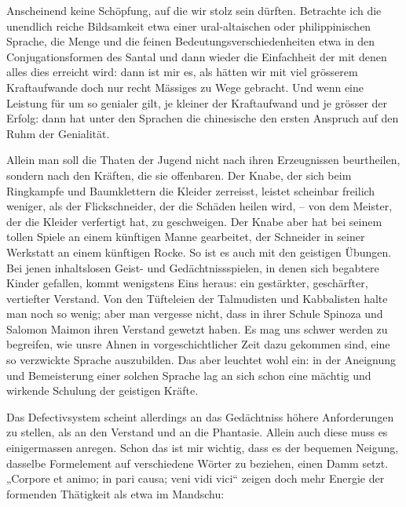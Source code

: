 Anscheinend keine Schöpfung, auf die wir stolz sein dürften. Betrachte ich die  unendlich reiche Bildsamkeit etwa einer ural-altaischen oder philippinischen Sprache, die Menge und die feinen Bedeutungsverschiedenheiten etwa in den Conjugationsformen des Santal und dann wieder die Einfachheit der  mit denen alles dies erreicht wird: dann ist mir es, als hätten wir mit viel grösserem Kraftaufwande doch nur recht Mässiges zu Wege gebracht. Und wenn eine Leistung für um so genialer gilt, je kleiner der Kraftaufwand und je grösser der Erfolg: dann hat unter den Sprachen die chinesische den ersten Anspruch auf den Ruhm der Genialität.

Allein man soll die Thaten der Jugend nicht nach ihren Erzeugnissen beurtheilen, sondern nach den Kräften, die sie offenbaren. Der Knabe, der sich beim Ringkampfe und Baumklettern die Kleider zerreisst, leistet scheinbar freilich weniger, als der Flickschneider, der die Schäden heilen wird, – von dem Meister, der die Kleider verfertigt hat, zu geschweigen. Der Knabe aber hat bei seinem tollen Spiele an einem künftigen Manne gearbeitet, der Schneider in seiner Werkstatt an einem künftigen Rocke. So ist es auch mit den geistigen \label{sp.400} Übungen. Bei jenen inhaltslosen Geist- und Gedächtnissspielen, in denen sich begabtere Kinder gefallen, kommt wenigstens Eins heraus: ein gestärkter, geschärfter, vertiefter Verstand. Von den Tüfteleien der Talmudisten und Kabbalisten halte man noch so wenig; aber man vergesse nicht, dass in ihrer Schule \label{fp.381} Spinoza und Salomon Maimon ihren Verstand gewetzt haben. Es mag uns schwer werden zu begreifen, wie unsre Ahnen in vorgeschichtlicher Zeit dazu gekommen sind, eine so verzwickte Sprache auszubilden. Das aber leuchtet wohl ein: in der Aneignung und Bemeisterung einer solchen Sprache lag an sich schon eine mächtig und  wirkende Schulung der geistigen Kräfte.

Das Defectivsystem scheint allerdings an das Gedächtniss höhere Anforderungen zu stellen, als an den Verstand und an die Phantasie. Allein auch diese muss es einigermassen anregen. Schon das ist mir wichtig, dass es der bequemen Neigung, dasselbe Formelement auf verschiedene Wörter zu beziehen, einen Damm setzt. „Corpore et animo; in pari causa; veni vidi vici“ zeigen doch mehr Energie der formenden Thätigkeit als etwa im Mandschu:

